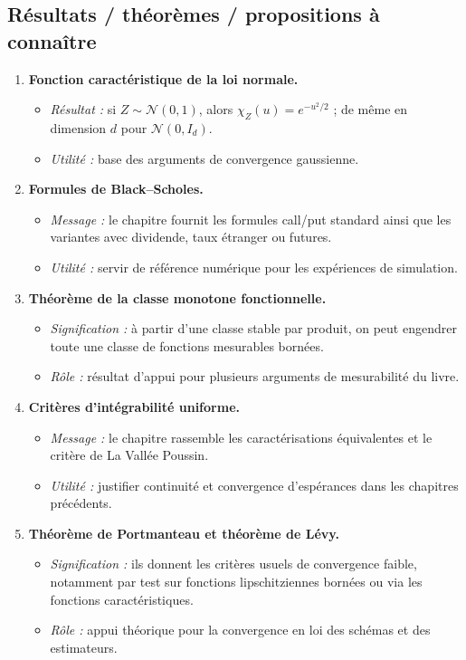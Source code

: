 \documentclass[11pt,a4paper]{article}
\begin{document}
\subsection{Résultats / théorèmes / propositions à connaître}

\begin{enumerate}[label=\textbf{\arabic*.}]
  \item \textbf{Fonction caractéristique de la loi normale.}
  \begin{itemize}
    \item \emph{Résultat :} si $Z\sim \mathcal N(0,1)$, alors $\chi_Z(u)=e^{-u^2/2}$ ; de même en dimension $d$ pour $\mathcal N(0,I_d)$.
    \item \emph{Utilité :} base des arguments de convergence gaussienne.
  \end{itemize}

  \item \textbf{Formules de Black--Scholes.}
  \begin{itemize}
    \item \emph{Message :} le chapitre fournit les formules call/put standard ainsi que les variantes avec dividende, taux étranger ou futures.
    \item \emph{Utilité :} servir de référence numérique pour les expériences de simulation.
  \end{itemize}

  \item \textbf{Théorème de la classe monotone fonctionnelle.}
  \begin{itemize}
    \item \emph{Signification :} à partir d'une classe stable par produit, on peut engendrer toute une classe de fonctions mesurables bornées.
    \item \emph{Rôle :} résultat d'appui pour plusieurs arguments de mesurabilité du livre.
  \end{itemize}

  \item \textbf{Critères d'intégrabilité uniforme.}
  \begin{itemize}
    \item \emph{Message :} le chapitre rassemble les caractérisations équivalentes et le critère de La Vallée Poussin.
    \item \emph{Utilité :} justifier continuité et convergence d'espérances dans les chapitres précédents.
  \end{itemize}

  \item \textbf{Théorème de Portmanteau et théorème de Lévy.}
  \begin{itemize}
    \item \emph{Signification :} ils donnent les critères usuels de convergence faible, notamment par test sur fonctions lipschitziennes bornées ou via les fonctions caractéristiques.
    \item \emph{Rôle :} appui théorique pour la convergence en loi des schémas et des estimateurs.
  \end{itemize}


\end{enumerate}
\end{document}
